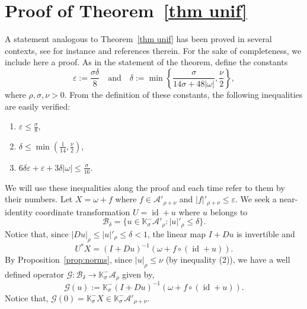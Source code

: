 \documentclass[12pt,reqno,a4paper]{amsart}%
\numberwithin{equation}{section}
\newcommand{\As}{{\mathscr{A}}}
\newcommand{\Bs}{{\mathscr{B}}}
\newcommand{\A}{{\mathcal A}}
\newcommand{\GG}{{\mathcal G}}
\newcommand{\Kk}{{\mathbb{K}}}
\newcommand{\Zz}{{\mathbb{Z}}}
\def\SL{\operatorname{SL}}
\def\SLZ{\SL_d(\Zz)}
\newcommand{\id}  {\operatorname{id}}
\begin{document}
%
%




\section{Proof of Theorem~\ref{thm unif}}
\label{sec:proof thm non-resonant modes}

A statement analogous to Theorem~\ref{thm unif} has been proved in several contexts, see for instance \cite{DiasGaivao2019} and references therein. For the sake of completeness,  we include here a proof.  As in the statement of the theorem, define the constants
$$
\varepsilon:=\frac{\sigma\delta}{8}\quad\text{and}\quad \delta:=\min\left\{\frac{\sigma}{14\sigma + 48|\omega|},\frac{\nu}2\right\},
$$
where $\rho,\sigma,\nu>0$.
From the definition of these constants, the following inequalities are easily verified:
\begin{enumerate}
\item \label{app B ineq 1}
$\varepsilon\leq \frac{\sigma}{8}$,
\item \label{app B ineq 2}
$\delta\leq \min\left(\frac{1}{14}, \frac{\nu}{2}\right)$,
\item \label{app B ineq 3}
$6\delta\varepsilon+\varepsilon+3\delta|\omega|\leq \frac{\sigma}{16}$.
\end{enumerate}
We will use these inequalities along the proof and each time refer to them by their numbers. 
Let $X=\omega + f$ where $f\in \A'_{\rho+\nu}$ and $|f|'_{\rho+\nu}\leq \varepsilon$. 
We seek a near-identity coordinate transformation $U=\id +u$ where $u$ belongs to
$$
\Bs_{\delta}=\{u\in \Kk^-_\sigma\A'_{\rho}\colon |u|'_{\rho}\leq\delta\}.
$$
Notice that, since $|Du|_\rho\leq |u|'_\rho\leq \delta<1$,  the linear map $I+ Du$ is invertible and
$$
U^*X=(I+Du)^{-1}(\omega+f\circ (\id + u)).
$$
By Proposition~\ref{prop:norms}, since $|u|_\rho\leq\nu$ (by inequality (2)), we have a well defined operator $\GG\colon\Bs_{\delta}\to \Kk^-_\sigma\A_{\rho}$ given by,
$$
\GG(u):= \Kk^-_\sigma(I+Du)^{-1}(\omega+f\circ (\id + u)).
$$
Notice that, $\GG(0)=\Kk^-_\sigma X\in\Kk^-_\sigma\A'_{\rho+\nu}$. 
\end{document}
